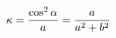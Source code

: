\documentclass[preview]{standalone}
\begin{document}
\begin{align*}
\special{dvisvgm:raw <g id='unique000'>}\kappa=\dfrac{\cos^2\alpha}{a}=\dfrac{a}{a^2+b^2}\special{dvisvgm:raw </g>}
\end{align*}
\end{document}
